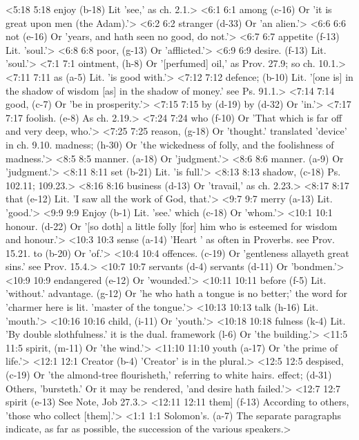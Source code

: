 <5:18 5:18  enjoy (b-18)  Lit 'see,' as ch. 2.1.>
<6:1 6:1  among (c-16)  Or 'it is great upon men (the Adam).'>
<6:2 6:2  stranger (d-33)  Or 'an alien.'>
<6:6 6:6  not (e-16)  Or 'years, and hath seen no good, do not.'>
<6:7 6:7  appetite (f-13) Lit. 'soul.'>
<6:8 6:8  poor, (g-13)  Or 'afflicted.'>
<6:9 6:9  desire. (f-13)  Lit. 'soul.'>
<7:1 7:1  ointment, (h-8)  Or '[perfumed] oil,' as Prov. 27.9; so ch. 10.1.>
<7:11 7:11  as (a-5)  Lit. 'is good with.'>
<7:12 7:12  defence; (b-10)  Lit. '[one is] in the shadow of wisdom [as] in the shadow of  money.' see Ps. 91.1.>
<7:14 7:14  good, (c-7)  Or 'be in prosperity.'>
<7:15 7:15  by (d-19)  by (d-32)
  Or 'in.'>
<7:17 7:17  foolish. (e-8)  As ch. 2.19.>
<7:24 7:24  who (f-10)  Or 'That which is far off and very deep, who.'>
<7:25 7:25  reason, (g-18)  Or 'thought.' translated 'device' in ch. 9.10.
  madness; (h-30)  Or 'the wickedness of folly, and the foolishness of madness.'>
<8:5 8:5  manner. (a-18) Or 'judgment.'>
<8:6 8:6  manner. (a-9)  Or 'judgment.'>
<8:11 8:11  set (b-21)  Lit. 'is full.'>
<8:13 8:13  shadow, (c-18)  Ps. 102.11; 109.23.>
<8:16 8:16  business (d-13)  Or 'travail,' as ch. 2.23.>
<8:17 8:17  that (e-12)  Lit. 'I saw all the work of God, that.'>
<9:7 9:7  merry (a-13)  Lit. 'good.'>
<9:9 9:9  Enjoy (b-1)  Lit. 'see.'
  which (c-18)  Or 'whom.'>
<10:1 10:1  honour. (d-22)  Or '[so doth] a little folly [for] him who is esteemed for  wisdom and honour.'>
<10:3 10:3  sense (a-14)  'Heart ' as often in Proverbs. see Prov. 15.21.
  to (b-20)  Or 'of.'>
<10:4 10:4  offences. (c-19)  Or 'gentleness allayeth great sins.' see Prov. 15.4.>
<10:7 10:7  servants (d-4)  servants (d-11)
  Or 'bondmen.'>
<10:9 10:9  endangered (e-12)  Or 'wounded.'>
<10:11 10:11  before (f-5)  Lit. 'without.'
  advantage. (g-12)  Or 'he who hath a tongue is no better;' the word for 'charmer  here is lit. 'master of the tongue.'>
<10:13 10:13  talk (h-16)  Lit. 'mouth.'>
<10:16 10:16  child, (i-11)  Or 'youth.'>
<10:18 10:18  fulness (k-4)  Lit. 'By double slothfulness.' it is the dual.
  framework (l-6)  Or 'the building.'>
<11:5 11:5  spirit, (m-11)  Or 'the wind.'>
<11:10 11:10  youth (a-17)  Or 'the prime of life.'>
<12:1 12:1  Creator (b-4)  'Creator' is in the plural.>
<12:5 12:5  despised, (c-19)  Or 'the almond-tree flourisheth,' referring to white hairs.
  effect; (d-31)  Others, 'bursteth.' Or it may be rendered, 'and desire hath  failed.'>
<12:7 12:7  spirit (e-13)  See Note, Job 27.3.>
<12:11 12:11  them] (f-13)  According to others, 'those who collect [them].'>
<1:1 1:1  Solomon's. (a-7)  The separate paragraphs indicate, as far as possible, the  succession of the various speakers.>
